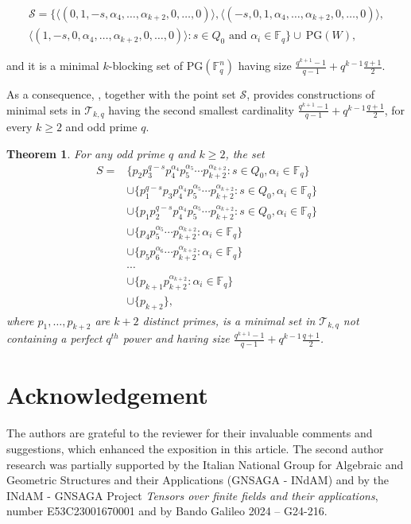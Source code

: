 \documentclass[12pt]{amsart}
\newtheorem{theorem}{Theorem}[section]
\newcommand{\F}{{\mathbb F}}
\newcommand{\PG}{\mathrm{PG}}
\begin{document}
\begin{multline} \label{eq:blockingsetsecond}
\mathcal{S} = \Big\{\langle (0, 1, -s,\alpha_4,\ldots,\alpha_{k+2},0,\ldots,0 ) \rangle, \langle(-s, 0, 1,\alpha_4,\ldots,\alpha_{k+2},0,\ldots,0 )\rangle, \\ \langle (1, -s, 0,\alpha_4,\ldots,\alpha_{k+2},0,\ldots,0 ) \rangle \colon s \in Q_0 \mbox{ and }\alpha_i \in \mathbb{F}_q\Big\}  \cup\  \PG(W),
\end{multline}

and it is a minimal $k$-blocking set of $\PG(\F_q^n)$ having size $\frac{q^{k+1}-1}{q-1}+q^{k-1}\frac{q+1}{2}$.

As a consequence, , together with the point set $\mathcal{S}$, provides constructions of minimal sets in $\mathcal{T}_{k,q}$ having the second smallest cardinality $\frac{q^{k+1}-1}{q-1}+q^{k-1}\frac{q+1}{2}$, for every $k \geq 2$ and odd prime $q$.


\begin{theorem}
For any odd prime $q$ and $k \geq 2$, the set
\[
\begin{array}{rl}
        S=& \{p_2p_3^{q-s}p_4^{\alpha_4}p_5^{\alpha_5}\cdots p_{k+2}^{\alpha_{k+2}} \colon s \in Q_0, \alpha_i \in \F_q\}    \\
        & \cup \{p_1^{q-s}p_3p_4^{\alpha_4}p_5^{\alpha_5}\cdots p_{k+2}^{\alpha_{k+2}}\colon s \in Q_0, \alpha_i \in \F_q \} \\
        & \cup \{p_1p_2^{q-s}p_4^{\alpha_4}p_5^{\alpha_5}\cdots p_{k+2}^{\alpha_{k+2}} \colon s \in Q_0, \alpha_i \in \F_q\} \\
&\cup \{p_4p_5^{\alpha_5}\cdots p_{k+2}^{\alpha_{k+2}} \colon \alpha_i \in \F_q\} \\
        & \cup \{p_5p_6^{\alpha_6}\cdots p_{k+2}^{\alpha_{k+2}} \colon  \alpha_i \in \F_q\} \\
        & \cdots \\
        & \cup \{p_{k+1}p_{k+2}^{\alpha_{k+2}} \colon  \alpha_i \in \F_q\} \\
        & \cup \{p_{k+2}\},
        \end{array}
\]
where $p_1,\ldots,p_{k+2}$ are $k+2$ distinct primes, is a minimal set in $\mathcal{T}_{k,q}$ not containing a perfect $q^{th}$ power and having size $\frac{q^{k+1}-1}{q-1}+q^{k-1}\frac{q+1}{2}$.
\end{theorem}

\section*{Acknowledgement}\footnotesize
The authors are grateful to the reviewer for their invaluable comments and suggestions, which enhanced the exposition in this article. The second author research was partially supported by the Italian National Group for Algebraic and Geometric Structures and their Applications (GNSAGA - INdAM) and by the INdAM - GNSAGA Project \emph{Tensors over finite fields and their applications}, number E53C23001670001 and by Bando Galileo 2024 – G24-216.
\end{document}
